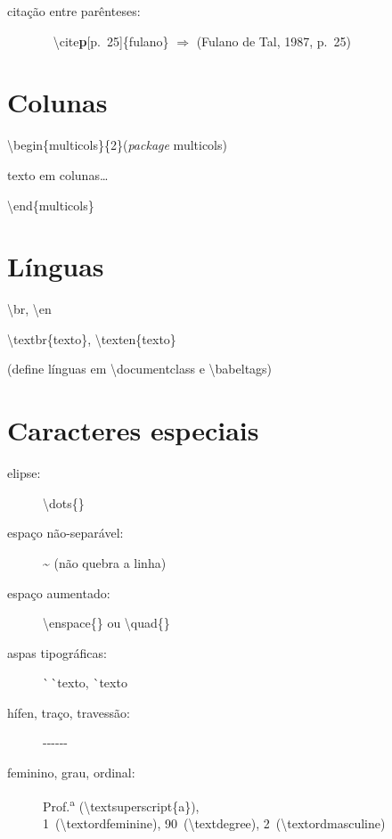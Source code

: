 \documentclass[10pt,twoside,english,brazilian]{article}
\begin{document}
\begin{multicols}{3}
\begin{description}
  \item[citação entre parênteses:]~\vspace{2pt}\newline
    \null\quad\textbackslash{}cite\textbf{p}[p.~25]\{fulano\} $\Rightarrow$ (Fulano de Tal, 1987, p.~25)
\end{description}

\section*{Colunas}

\textbackslash{}begin\{multicols\}\{2\}\quad (\textit{package} \textsf{multicols})

\quad texto em colunas\dots

\textbackslash{}end\{multicols\}

\columnbreak

\section*{Línguas}

\textbackslash{}br, \textbackslash{}en

\textbackslash{}textbr\{texto\}, \textbackslash{}texten\{texto\}

(define línguas em \textsf{\textbackslash{}documentclass} e \textsf{\textbackslash{}babeltags})

\section*{Caracteres especiais}

\begin{description}
  \item[elipse:] \textbackslash{}dots\{\}
  \item[espaço não-separável:] \textasciitilde{} (não quebra a linha)
  \item[espaço aumentado:] \textbackslash{}enspace\{\} ou \textbackslash{}quad\{\}
  \item[aspas tipográficas:] \strut\`\space\,\`\space\;\!texto\;\!\textquotesingle\:\textquotesingle,
                \`\space\;\!texto\;\!\textquotesingle
  \item[hífen, traço, travessão:] -\quad -\hspace{.7pt}-\quad -\hspace{.7pt}-\hspace{.7pt}-
  \item[feminino, grau, ordinal:]
                Prof.\textsuperscript{a} (\textbackslash textsuperscript\{a\}),\\
                1\textordfeminine\ (\textbackslash textordfeminine),
                90\textdegree\ (\textbackslash textdegree),
                2\textordmasculine\ (\textbackslash textordmasculine)
\end{description}


\end{multicols}
\end{document}
